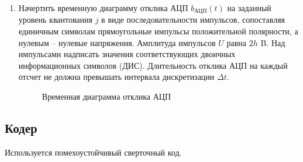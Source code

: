 \documentclass[a4paper, 12pt]{article}
\begin{document}
\begin{enumerate}
  \item Начертить временную диаграмму отклика АЦП 
  $b_{АЦП}(t)$ на заданный уровень квантования $j$ 
  в виде последовательности импульсов, 
  сопоставляя единичным символам прямоугольные импульсы 
  положительной полярности, а нулевым -- нулевые напряжения. 
  Амплитуда импульсов $U$ равна $2h$ B. Над импульсами 
  надписать значения соответствующих двоичных информационных 
  символов (ДИС). Длительность отклика АЦП на каждый отсчет 
  не должна превышать интервала дискретизации $\Delta t$.
  \begin{figure}[H]
    \centering
    \caption{Временная диаграмма отклика АЦП}
  \end{figure}
\end{enumerate}

\subsection{Кодер}
Используется помехоустойчивый сверточный код.
\end{document}
